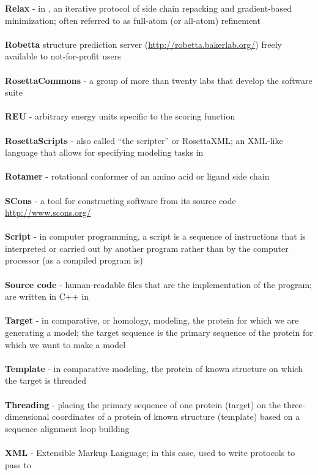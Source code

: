 \textbf{Relax} - in \rosetta, an iterative protocol of side chain repacking and gradient-based minimization; often referred to as full-atom (or all-atom) refinement \\ \\

\textbf{Robetta}  \rosetta structure prediction server (\url{http://robetta.bakerlab.org/}) freely available to not-for-profit users \\ \\

\textbf{RosettaCommons} - a group of more than twenty labs that develop the \rosetta software suite  \\ \\

\textbf{REU} - arbitrary energy units specific to the \rosetta scoring function \\ \\

\textbf{RosettaScripts} - also called ``the scripter'' or RosettaXML; an XML-like language that allows for specifying modeling tasks in \rosetta \\ \\

\textbf{Rotamer} - rotational conformer of an amino acid or ligand side chain \\ \\

\textbf{SCons} - a tool for constructing software from its source code \url{http://www.scons.org/} \\ \\

\textbf{Script} - in computer programming, a script is a sequence of instructions that is interpreted or carried out by another program rather than by the computer processor (as a compiled program is) \\ \\

\textbf{Source code} - human-readable files that are the implementation of the program; are written in C++ in \rosetta \\ \\

\textbf{Target} - in comparative, or homology, modeling, the protein for which we are generating a model; the target sequence is the primary sequence of the protein for which we want to make a model \\ \\

\textbf{Template} - in comparative modeling, the protein of known structure on which the target is threaded \\ \\

\textbf{Threading} - placing the primary sequence of one protein (target) on the three-dimensional coordinates of a protein of known structure (template) based on a sequence alignment loop building \\ \\

\textbf{XML} - Extensible Markup Language; in this case, used to write protocols to pass to

\clearpage
